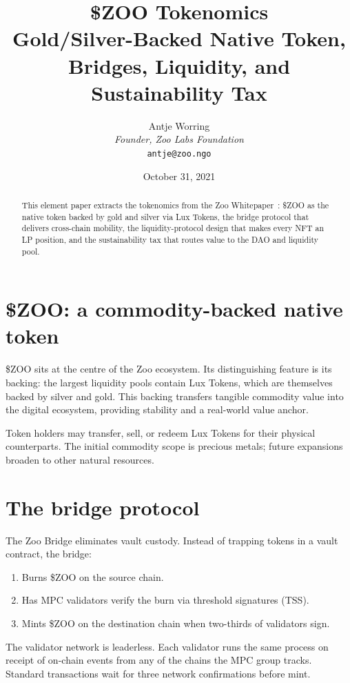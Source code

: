 \documentclass[11pt,letterpaper]{article}
\title{\textbf{\$ZOO Tokenomics}\\\large Gold/Silver-Backed Native Token, Bridges, Liquidity, and Sustainability Tax}
\author{Antje Worring \\ \textit{Founder, Zoo Labs Foundation} \\ \texttt{antje@zoo.ngo}}
\date{October 31, 2021}
\begin{document}
\maketitle

\begin{abstract}
This element paper extracts the tokenomics from the Zoo Whitepaper~\cite{zoo2021}: \$ZOO as the native token backed by gold and silver via Lux Tokens, the bridge protocol that delivers cross-chain mobility, the liquidity-protocol design that makes every NFT an LP position, and the sustainability tax that routes value to the DAO and liquidity pool.
\end{abstract}

\section{\$ZOO: a commodity-backed native token}

\$ZOO sits at the centre of the Zoo ecosystem. Its distinguishing feature is its backing: the largest liquidity pools contain Lux Tokens, which are themselves backed by silver and gold. This backing transfers tangible commodity value into the digital ecosystem, providing stability and a real-world value anchor.

Token holders may transfer, sell, or redeem Lux Tokens for their physical counterparts. The initial commodity scope is precious metals; future expansions broaden to other natural resources.

\section{The bridge protocol}

The Zoo Bridge eliminates vault custody. Instead of trapping tokens in a vault contract, the bridge:

\begin{enumerate}
  \item Burns \$ZOO on the source chain.
  \item Has MPC validators verify the burn via threshold signatures (TSS).
  \item Mints \$ZOO on the destination chain when two-thirds of validators sign.
\end{enumerate}

The validator network is leaderless. Each validator runs the same process on receipt of on-chain events from any of the chains the MPC group tracks. Standard transactions wait for three network confirmations before mint.
\end{document}
